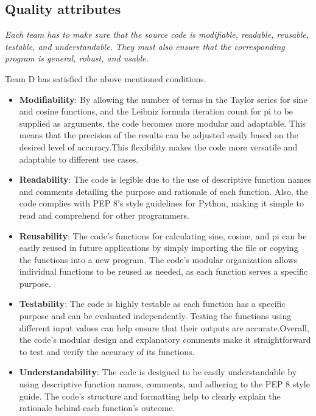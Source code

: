   \subsection{Quality attributes}
  \begin{flushleft}
    \textit{Each team has to make sure that the source code is modifiable, readable, reusable, testable, and understandable. They must also ensure that the corresponding program is general, robust, and usable.}
  \end{flushleft}
  \begin{flushleft}
    Team D has satisfied the above mentioned conditions.
    \begin{itemize}
         \item \textbf{Modifiability}: By allowing the number of terms in the Taylor series for sine and cosine functions, and the Leibniz formula iteration count for pi to be supplied as arguments, the code becomes more modular and adaptable. This means that the precision of the results can be adjusted easily based on the desired level of accuracy.This flexibility makes the code more versatile and adaptable to different use cases.
    
         \item \textbf{Readability}: The code is legible due to the use of descriptive function names and comments detailing the purpose and rationale of each function. Also, the code complies with PEP 8's style guidelines for Python, making it simple to read and comprehend for other programmers.
    
         \item \textbf{Reusability}: The code's functions for calculating sine, cosine, and pi can be easily reused in future applications by simply importing the file or copying the functions into a new program. The code's modular organization allows individual functions to be reused as needed, as each function serves a specific purpose.
    
         \item \textbf{Testability}: The code is highly testable as each function has a specific purpose and can be evaluated independently. Testing the functions using different input values can help ensure that their outputs are accurate.Overall, the code's modular design and explanatory comments make it straightforward to test and verify the accuracy of its functions.
    
         \item \textbf{Understandability}: The code is designed to be easily understandable by using descriptive function names, comments, and adhering to the PEP 8 style guide. The code's structure and formatting help to clearly explain the rationale behind each function's outcome.
    
        
    \end{itemize}
  \end{flushleft}
